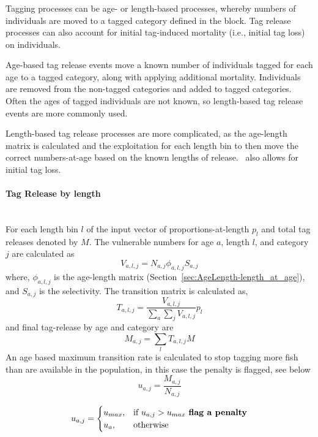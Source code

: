 \subsubsection{}\label{sec:Process-TagByAge}\label{sec:Process-TagByLength} 

Tagging processes can be age- or length-based processes, whereby numbers of individuals are moved to a tagged category defined in the  block. Tag release processes can also account for initial tag-induced mortality (i.e., initial tag loss) on individuals.

Age-based tag release events move a known number of individuals tagged for each age to a tagged category, along with applying additional mortality. Individuals are removed from the non-tagged categories and added to tagged categories. Often the ages of tagged individuals are not known, so length-based tag release events are more commonly used.

Length-based tag release processes are more complicated, as the age-length matrix is calculated and the exploitation for each length bin to then move the correct numbers-at-age based on the known lengths of release. \CNAME\ also allows for initial tag loss.

\paragraph*{{Tag Release by length}}
\\

For each length bin $l$ of the input vector of proportions-at-length ${p}_l$ and total tag releases denoted by \(M\). The vulnerable numbers for age \(a\), length \(l\), and category \(j\) are calculated as
$$V_{a,l,j} = N_{a,j} \phi_{a,l,j} S_{a,j}$$
where, \(\phi_{a,l,j}\) is the age-length matrix (Section~\ref{sec:AgeLength-length_at_age}), and \(S_{a,j}\) is the selectivity. The transition matrix is calculated as,
$$ T_{a,l,j}= \frac{V_{a,l,j}}{\sum_a\sum_j V_{a,l,j}} {p}_l$$
and final tag-release by age and category are
$$ M_{a,j} = \sum_l T_{a,l,j}M  $$
An age based maximum transition rate is calculated to stop tagging more fish than are available in the population, in this case the penalty is flagged, see below
$$ u_{a,j} = \frac{ M_{a,j} }{N_{a,j} }  $$

$$
u_{a,j} =
\begin{cases}
u_{max},& \text{if } u_{a,j} > u_{max} \text{ \textbf{flag a penalty}}\\
u_{a},  & \text{otherwise}
\end{cases}
$$


